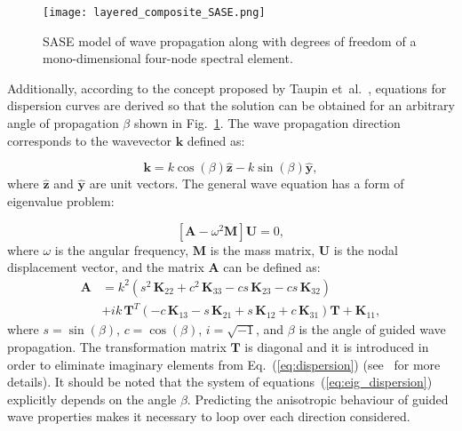 \documentclass[preprint,12pt]{elsarticle}
\newcommand{\matr}[1]{\mathbf{#1}} %
\newcommand{\vect}[1]{\mathbf{#1}} %
\begin{document}
		\begin{figure} [h!]
		\centering
		\texttt{[image: layered\_composite\_SASE.png]}
		\caption{SASE model of wave propagation along with degrees of freedom of a mono-dimensional four-node spectral element.}
		\label{fig:layered_composite_SASE}
	\end{figure}
	
	Additionally, according to the concept proposed by Taupin et~al.~\cite{Taupin2011}, equations for dispersion curves are derived so that the solution can be obtained for an arbitrary angle of propagation $\beta$ shown in Fig.~\ref{fig:layered_composite_SASE}. The wave propagation direction corresponds to the wavevector $\vect{k}$ defined as:
	
	\begin{equation}
	  \vect{k} = k \cos (\beta)\hat{ \vect{z}} - k \sin (\beta) \hat{\vect{y}},
		\label{eq:wavevector}
	\end{equation}
	where $\hat{ \vect{z}} $ and $\hat{\vect{y}}$ are unit vectors. The general wave equation has a form of eigenvalue problem:

	\begin{equation}
	\left[\matr{A} - \omega^2\matr{M} \right] \vect{U} =0,
	\label{eq:eig_dispersion}
	\end{equation}
	where $\omega$ is the angular frequency, $\matr{M}$ is the mass matrix, $\matr{U}$ is the nodal displacement vector, and the matrix $\matr{A}$ can be defined as:
	\begin{equation}
	\begin{aligned}
	\matr{A} & =  k^2\left(s^2 \,\matr{K}_{22} + c^2\, \matr{K}_{33} - c s\, \matr{K}_{23} - c s\, \matr{K}_{32}\right) \\
	& + i k\, \matr{T}^T\left(-c\, \matr{K}_{13} - s\, \matr{K}_{21} + s\, \matr{K}_{12} + c\, \matr{K}_{31}\right) \matr{T} +\matr{K}_{11},
	\end{aligned}
	\label{eq:dispersion}
	\end{equation}
	where  $s = \sin(\beta)$, $c = \cos(\beta)$, $i = \sqrt{-1}$, and $\beta$ is the angle of guided wave propagation. The transformation matrix $\matr{T}$ is diagonal and it is introduced in order to eliminate imaginary elements from Eq.~(\ref{eq:dispersion}) (see~\cite{Bartoli2006} for more details). It should be noted that the system of equations~(\ref{eq:eig_dispersion}) explicitly depends on the angle $\beta$. Predicting the anisotropic behaviour of guided wave properties makes it necessary to loop over each direction considered.
	
\end{document}
